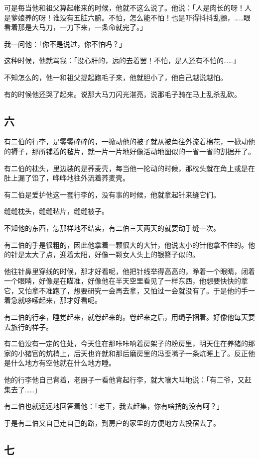 \documentclass[UTF8]{ctexart}
\begin{document}
可是每当他和祖父算起帐来的时候，他就不这么说了。他说：「人是肉长的呀！人是爹娘养的呀！谁没有五脏六腑。不怕，怎么能不怕！也是吓得抖抖乱颤，……眼看着那是大马刀，一刀下来，一条命就完了。」

我一问他：「你不是说过，你不怕吗？」

这种时候，他就骂我：「没心肝的，远的去着罢！不怕，是人还有不怕的……」

不知怎么的，他一和祖父提起跑毛子来，他就胆小了，他自己越说越怕。

有的时候他还哭了起来。说那大马刀闪光湛亮，说那毛子骑在马上乱杀乱砍。

\subsection{六}

有二伯的行李，是零零碎碎的，一掀动他的被子就从被角往外流着棉花，一掀动他的褥子，那所铺着的毡片，就一片一片地好像活动地图似的一省一省的割据开了。

有二伯的枕头，里边装的是荞麦壳，每当他一抡动的时候，那枕头就在角上或是在肚上漏了馅了，哗哗地往外流着荞麦壳。

有二伯是爱护他这一套行李的，没有事的时候，他就拿起针来缝它们。

缝缝枕头，缝缝毡片，缝缝被子。

不知他的东西，怎那样地不结实，有二伯三天两天的就要动手缝一次。

有二伯的手是很粗的，因此他拿着一颗很大的大针，他说太小的针他拿不住的。他的针是太大了点，迎着太阳，好像一颗女人头上的银簪子似的。

他往针鼻里穿线的时候，那才好看呢，他把针线举得高高的，睁着一个眼睛，闭着一个眼睛，好像是在瞄准，好像他在半天空里看见了一样东西，他想要快快的拿它，又怕拿不准跑了，想要研究一会再去拿，又怕过一会就没有了。于是他的手一着急就哆嗦起来，那才好看呢。

有二伯的行李，睡觉起来，就卷起来的。卷起来之后，用绳子捆着。好像他每天要去旅行的样子。

有二伯没有一定的住处，今天住在那咔咔响着房架子的粉房里，明天住在养猪的那家的小猪官的炕梢上，后天也许就和那后磨房里的冯歪嘴子一条炕睡上了。反正他是什么地方有空他就在什么地方睡。

他的行李他自己背着，老厨子一看他背起行李，就大嚷大叫地说：「有二爷，又赶集去了……」

有二伯也就远远地回答着他：「老王，我去赶集，你有啥捎的没有呵？」

于是有二伯又自己走自己的路，到房户的家里的方便地方去投宿去了。

\subsection{七}
\end{document}
